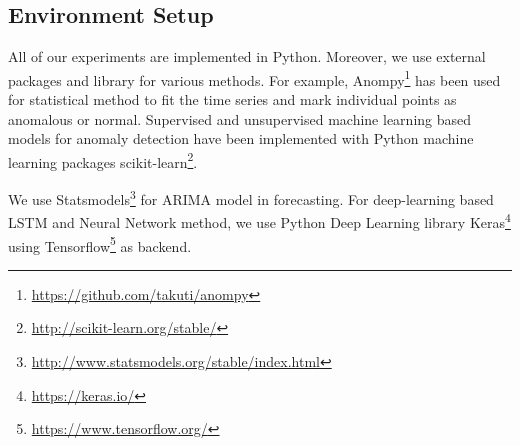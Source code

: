 \subsection{Environment Setup}
All of our experiments are implemented in Python. Moreover, we use external packages and library for various methods. For example, Anompy\footnote{\url{https://github.com/takuti/anompy}} has been used for statistical method to fit the time series and mark individual points as anomalous or normal. Supervised and unsupervised machine learning based models for anomaly detection have been implemented with Python machine learning packages scikit-learn\footnote{\url{http://scikit-learn.org/stable/}}.

We use Statsmodels\footnote{\url{http://www.statsmodels.org/stable/index.html}} for ARIMA model in forecasting. For deep-learning based LSTM and Neural Network method, we use Python Deep Learning library Keras\footnote{\url{https://keras.io/}} using Tensorflow\footnote{\url{https://www.tensorflow.org/}} as backend.